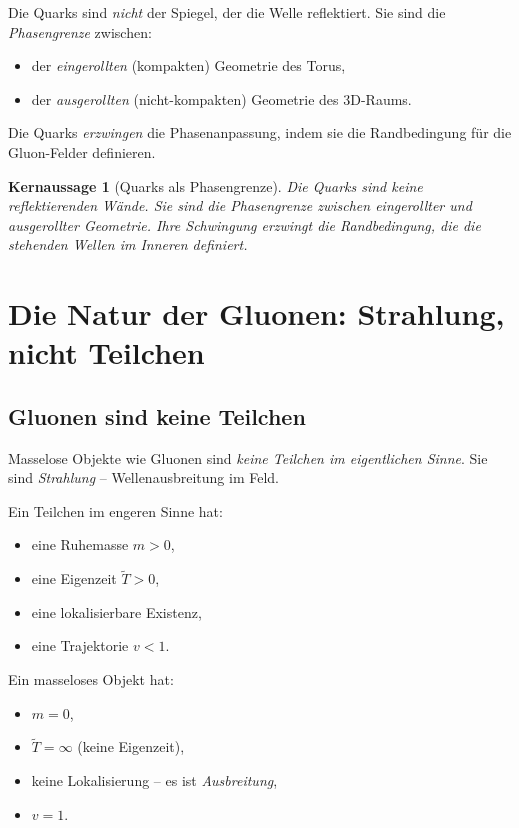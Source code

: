 \documentclass[11pt,a4paper]{article}
\newtheorem{keyresult}{Kernaussage}
\begin{document}
	Die Quarks sind \emph{nicht} der Spiegel, der die Welle reflektiert. 
	Sie sind die \emph{Phasengrenze} zwischen:
	\begin{itemize}
		\item der \emph{eingerollten} (kompakten) Geometrie des Torus,
		\item der \emph{ausgerollten} (nicht-kompakten) Geometrie des 3D-Raums.
	\end{itemize}
	
	Die Quarks \emph{erzwingen} die Phasenanpassung, indem sie die Randbedingung für die Gluon-Felder definieren.
	
	\begin{keyresult}[Quarks als Phasengrenze]
		Die Quarks sind keine reflektierenden Wände. 
		Sie sind die \emph{Phasengrenze} zwischen eingerollter und ausgerollter Geometrie. 
		Ihre Schwingung erzwingt die Randbedingung, die die stehenden Wellen im Inneren definiert.
	\end{keyresult}
	
	\section{Die Natur der Gluonen: Strahlung, nicht Teilchen}
	
	\subsection{Gluonen sind keine Teilchen}
	
	Masselose Objekte wie Gluonen sind \emph{keine Teilchen im eigentlichen Sinne}. 
	Sie sind \emph{Strahlung} -- Wellenausbreitung im Feld.
	
	Ein Teilchen im engeren Sinne hat:
	\begin{itemize}
		\item eine Ruhemasse \(m > 0\),
		\item eine Eigenzeit \(\tilde{T} > 0\),
		\item eine lokalisierbare Existenz,
		\item eine Trajektorie \(v < 1\).
	\end{itemize}
	
	Ein masseloses Objekt hat:
	\begin{itemize}
		\item \(m = 0\),
		\item \(\tilde{T} = \infty\) (keine Eigenzeit),
		\item keine Lokalisierung -- es ist \emph{Ausbreitung},
		\item \(v = 1\).
	\end{itemize}
	
\end{document}
